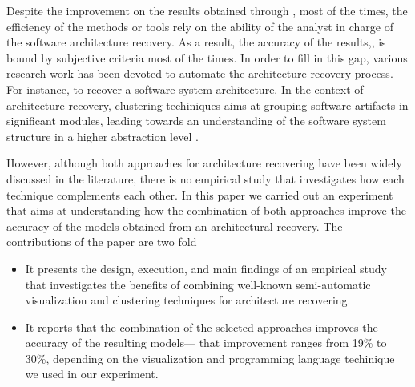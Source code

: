 Despite the improvement on the results obtained through , most of the times, 
the efficiency of the methods or tools rely on the ability of the analyst in charge of the software architecture recovery. As a result, the accuracy of the results,, is bound by subjective criteria most of the times. In order to fill in this gap, 
various research work has been devoted to automate the architecture recovery process. For instance,  to recover a software system architecture\cite{shtern_clustering_2012, Jain_Murty_1999, Wiggerts, mitchell_heuristic_2002}. 
In the context of architecture recovery, clustering techiniques aims at grouping software artifacts in significant modules, leading towards an understanding of 
the software system structure in a higher abstraction level \cite{shtern_clustering_2012}.

However, although both approaches for architecture recovering have been widely discussed in the literature, 
there is no empirical study that investigates how each technique complements each other. 
In this paper we 
carried out an experiment that aims at understanding how the combination of both approaches improve 
the accuracy of the models obtained from an architectural recovery. The contributions of the paper 
are two fold 

\begin{itemize}
\item It presents the design, execution, and main findings of an empirical study that 
investigates the benefits of combining well-known semi-automatic visualization and clustering 
techniques for architecture recovering. 

\item It reports that the combination of the selected approaches improves the accuracy of the 
resulting models--- that improvement ranges from 19\% to 30\%, depending on 
the visualization and programming language techinique we used in our experiment.   

\end{itemize}

